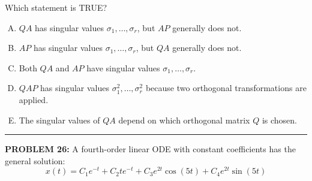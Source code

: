 \documentclass[12pt]{amsart}
\newcommand{\divider}{
  \vspace{-1em} %
  \noindent
  \raisebox{-0.15ex}{\textbullet}%
  \hspace{0.5em}%
  \rule[0.5ex]{0.95\textwidth}{1.0pt}%
  \hspace{0.5em}%
  \raisebox{-0.15ex}{\textbullet}%
  \vspace{0em} %
}
\begin{document}
{Which statement is TRUE?

\begin{enumerate}[(A)]
\item $QA$ has singular values $\sigma_1, \ldots, \sigma_r$, but $AP$ generally does not.
\item $AP$ has singular values $\sigma_1, \ldots, \sigma_r$, but $QA$ generally does not.
\item Both $QA$ and $AP$ have singular values $\sigma_1, \ldots, \sigma_r$.
\item $QAP$ has singular values $\sigma_1^2, \ldots, \sigma_r^2$ because two orthogonal transformations are applied.
\item The singular values of $QA$ depend on which orthogonal matrix $Q$ is chosen.
\end{enumerate}

%
%
%

\divider


\newpage

{\bf PROBLEM 26:}
% 
A fourth-order linear ODE with constant coefficients has the general solution:
$$x(t) = C_1 e^{-t} + C_2 te^{-t} + C_3 e^{2t}\cos(5t) + C_4 e^{2t}\sin(5t)$$

}
\end{document}

